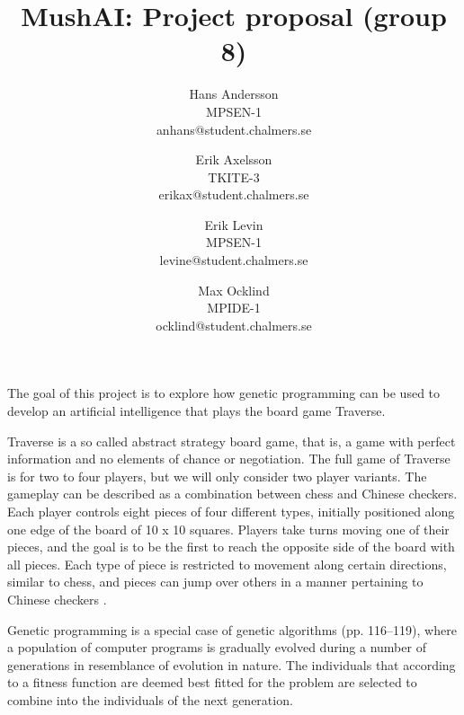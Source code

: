 \documentclass[times, 10pt,twocolumn]{article}
\begin{document}
\title{MushAI: Project proposal (group 8)}

\author{Hans Andersson\\
MPSEN-1\\anhans@student.chalmers.se\\
\and
Erik Axelsson\\
TKITE-3\\
erikax@student.chalmers.se\\
\and
Erik Levin\\
MPSEN-1\\
levine@student.chalmers.se
\and
Max Ocklind\\
MPIDE-1\\
ocklind@student.chalmers.se
}

\maketitle
\thispagestyle{empty}



The goal of this project is to explore how genetic programming can be used to develop an artificial intelligence that plays the board game Traverse.

Traverse is a so called abstract strategy board game, that is, a game with perfect information and no elements of chance or negotiation. The full game of Traverse is for two to four players, but we will only consider two player variants. The gameplay can be described as a combination between chess and Chinese checkers. Each player controls eight pieces of four different types, initially positioned along one edge of the board of 10 x 10 squares. Players take turns moving one of their pieces, and the goal is to be the first to reach the opposite side of the board with all pieces. Each type of piece is restricted to movement along certain directions, similar to chess, and pieces can jump over others in a manner pertaining to Chinese checkers \cite{rules}.

Genetic programming is a special case of genetic algorithms \cite{course_book} (pp. 116--119), where a population of computer programs is gradually evolved during a number of generations in resemblance of evolution in nature. The individuals that according to a fitness function are deemed best fitted for the problem are selected to combine into the individuals of the next generation.
\end{document}

